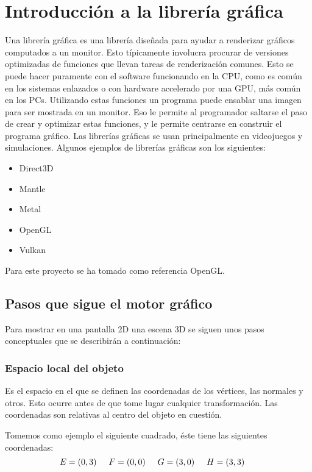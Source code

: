 \chapter{Introducción a la librería gráfica}
Una librería gráfica es una librería diseñada para ayudar a renderizar gráficos computados a un monitor. Esto típicamente involucra procurar de versiones optimizadas de funciones que llevan tareas de renderización comunes. Esto se puede hacer puramente con el software funcionando en la CPU, como es común en los sistemas enlazados o con hardware accelerado por una GPU, más común en los PCs. Utilizando estas funciones un programa puede ensablar una imagen para ser mostrada en un monitor. Eso le permite al programador saltarse el paso de crear y optimizar estas funciones, y le permite centrarse en construir el programa gráfico. Las librerías gráficas se usan principalmente en videojuegos y simulaciones.
Algunos ejemplos de librerías gráficas son los siguientes:
\begin{itemize}
\item{Direct3D}
\item{Mantle}
\item{Metal}
\item{OpenGL}
\item{Vulkan}
\end{itemize}
Para este proyecto se ha tomado como referencia OpenGL.

\newpage
\section{Pasos que sigue el motor gráfico}
Para mostrar en una pantalla 2D una escena 3D se siguen unos pasos conceptuales que se describirán a continuación: 
\subsection{Espacio local del objeto}
Es el espacio en el que se definen las coordenadas de los vértices, las normales y otros. Esto ocurre antes de que tome lugar cualquier transformación. Las coordenadas son relativas al centro del objeto en cuestión. 

Tomemos como ejemplo el siguiente cuadrado, éste tiene las siguientes coordenadas:
\[
E = (0, 3) \hspace*{0.5cm}
F = (0, 0) \hspace*{0.5cm} 
G = (3, 0) \hspace*{0.5cm} 
H = (3, 3) \hspace*{0.5cm} 
\]

